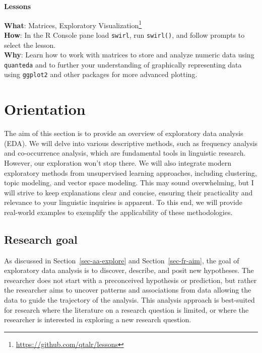 \documentclass[
  letterpaper,
  DIV=11,
  numbers=noendperiod]{scrreport}
\theoremstyle{definition}
\theoremstyle{remark}
\DeclareRobustCommand{\href}[2]{#2\footnote{\url{#1}}}
\begin{document}
\begin{tcolorbox}[enhanced jigsaw, leftrule=.75mm, bottomrule=.15mm, opacityback=0, breakable, left=2mm, colback=white, toprule=.15mm, arc=.35mm, rightrule=.15mm]

\textbf{ Lessons}

\textbf{What}: \href{https://github.com/qtalr/lessons}{Matrices,
Exploratory Visualization}\\
\textbf{How}: In the R Console pane load \texttt{swirl}, run
\texttt{swirl()}, and follow prompts to select the lesson.\\
\textbf{Why}: Learn how to work with matrices to store and analyze
numeric data using \texttt{quanteda} and to further your understanding
of graphically representing data using \texttt{ggplot2} and other
packages for more advanced plotting.

\end{tcolorbox}

\hypertarget{sec-eda-orientation}{%
\section{Orientation}\label{sec-eda-orientation}}

The aim of this section is to provide an overview of exploratory data
analysis (EDA). We will delve into various descriptive methods, such as
frequency analysis and co-occurrence analysis, which are fundamental
tools in linguistic research. However, our exploration won't stop there.
We will also integrate modern exploratory methods from unsupervised
learning approaches, including clustering, topic modeling, and vector
space modeling. This may sound overwhelming, but I will strive to keep
explanations clear and concise, ensuring their practicality and
relevance to your linguistic inquiries is apparent. To this end, we will
provide real-world examples to exemplify the applicability of these
methodologies.

\hypertarget{sec-eda-research-goal}{%
\subsection{Research goal}\label{sec-eda-research-goal}}

As discussed in Section~\ref{sec-aa-explore} and
Section~\ref{sec-fr-aim}, the goal of exploratory data analysis is to
discover, describe, and posit new hypotheses. The researcher does not
start with a preconceived hypothesis or prediction, but rather the
researcher aims to uncover patterns and associations from data allowing
the data to guide the trajectory of the analysis. This analysis approach
is best-suited for research where the literature on a research question
is limited, or where the researcher is interested in exploring a new
research question.
\end{document}
